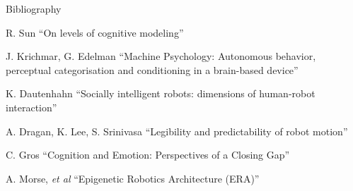\documentclass[compress]{beamer}
\begin{document}
\begin{frame}{Bibliography}
\begin{thebibliography}{10}

	\tiny{

    \beamertemplatearticlebibitems
    R. Sun
    \newblock ``On levels of cognitive modeling''

    \beamertemplatearticlebibitems
    J. Krichmar, G. Edelman
    \newblock ``Machine Psychology: Autonomous behavior, perceptual categorisation and conditioning in a brain-based device''

    \beamertemplatearticlebibitems
    K. Dautenhahn
    \newblock ``Socially intelligent robots: dimensions of human-robot interaction''

    \beamertemplatearticlebibitems
    A. Dragan, K. Lee, S. Srinivasa
    \newblock ``Legibility and predictability of robot motion''
    
	\beamertemplatearticlebibitems
    C. Gros
    \newblock ``Cognition and Emotion: Perspectives of a Closing Gap''
    
    \beamertemplatearticlebibitems
    A. Morse, \textit{et al}
    \newblock ``Epigenetic Robotics Architecture (ERA)''
    
    }


  \end{thebibliography}
\end{frame}
\end{document}
